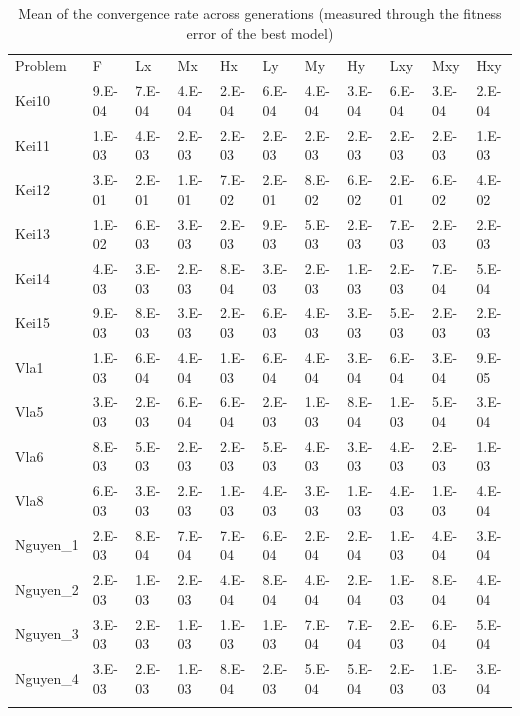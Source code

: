\begin{table}
\caption{Mean of the convergence rate across generations (measured through the fitness error of the best model)}
\label{tab:CR}       %
\begin{tabular}{lllllllllll}
\hline\noalign{\smallskip}
Problem & F & Lx & Mx & Hx & Ly & My & Hy & Lxy & Mxy & Hxy  \\
\noalign{\smallskip}\hline\noalign{\smallskip}
Kei10 & 9.E-04 & 7.E-04 & 4.E-04 & 2.E-04 & 6.E-04 & 4.E-04 & 3.E-04 & 6.E-04 & 3.E-04 & 2.E-04 \\
Kei11 & 1.E-03 & 4.E-03 & 2.E-03 & 2.E-03 & 2.E-03 & 2.E-03 & 2.E-03 & 2.E-03 & 2.E-03 & 1.E-03 \\
Kei12 & 3.E-01 & 2.E-01 & 1.E-01 & 7.E-02 & 2.E-01 & 8.E-02 & 6.E-02 & 2.E-01 & 6.E-02 & 4.E-02 \\
Kei13 & 1.E-02 & 6.E-03 & 3.E-03 & 2.E-03 & 9.E-03 & 5.E-03 & 2.E-03 & 7.E-03 & 2.E-03 & 2.E-03 \\
Kei14 & 4.E-03 & 3.E-03 & 2.E-03 & 8.E-04 & 3.E-03 & 2.E-03 & 1.E-03 & 2.E-03 & 7.E-04 & 5.E-04 \\
Kei15 & 9.E-03 & 8.E-03 & 3.E-03 & 2.E-03 & 6.E-03 & 4.E-03 & 3.E-03 & 5.E-03 & 2.E-03 & 2.E-03 \\
Vla1 & 1.E-03 & 6.E-04 & 4.E-04 & 1.E-03 & 6.E-04 & 4.E-04 & 3.E-04 & 6.E-04 & 3.E-04 & 9.E-05 \\
Vla5 & 3.E-03 & 2.E-03 & 6.E-04 & 6.E-04 & 2.E-03 & 1.E-03 & 8.E-04 & 1.E-03 & 5.E-04 & 3.E-04 \\
Vla6 & 8.E-03 & 5.E-03 & 2.E-03 & 2.E-03 & 5.E-03 & 4.E-03 & 3.E-03 & 4.E-03 & 2.E-03 & 1.E-03 \\
Vla8 & 6.E-03 & 3.E-03 & 2.E-03 & 1.E-03 & 4.E-03 & 3.E-03 & 1.E-03 & 4.E-03 & 1.E-03 & 4.E-04 \\
Nguyen\_1 & 2.E-03 & 8.E-04 & 7.E-04 & 7.E-04 & 6.E-04 & 2.E-04 & 2.E-04 & 1.E-03 & 4.E-04 & 3.E-04 \\
Nguyen\_2 & 2.E-03 & 1.E-03 & 2.E-03 & 4.E-04 & 8.E-04 & 4.E-04 & 2.E-04 & 1.E-03 & 8.E-04 & 4.E-04 \\
Nguyen\_3 & 3.E-03 & 2.E-03 & 1.E-03 & 1.E-03 & 1.E-03 & 7.E-04 & 7.E-04 & 2.E-03 & 6.E-04 & 5.E-04 \\
Nguyen\_4 & 3.E-03 & 2.E-03 & 1.E-03 & 8.E-04 & 2.E-03 & 5.E-04 & 5.E-04 & 2.E-03 & 1.E-03 & 3.E-04 \\
\noalign{\smallskip}\hline
\end{tabular}
\end{table}


